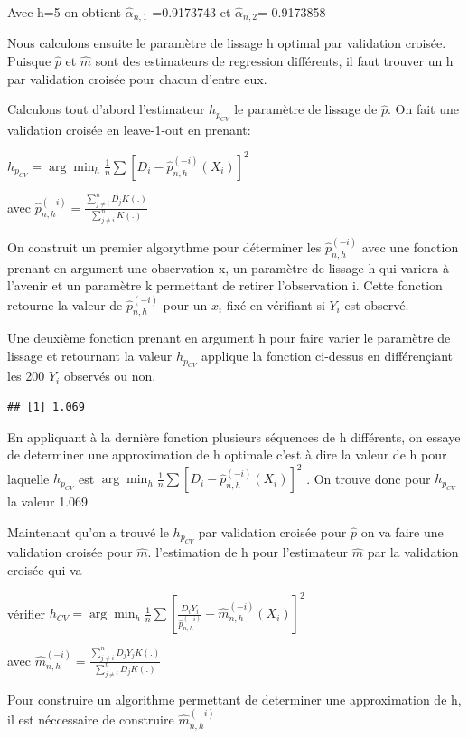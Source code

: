 \documentclass[
]{article}
\begin{document}
Avec h=5 on obtient \(\hat \alpha_{n,1}\) =0.9173743 et
\(\hat \alpha_{n,2}\)= 0.9173858

Nous calculons ensuite le paramètre de lissage h optimal par validation
croisée. Puisque \(\hat p\) et \(\hat m\) sont des estimateurs de
regression différents, il faut trouver un h par validation croisée pour
chacun d'entre eux.

Calculons tout d'abord l'estimateur \(h_{p_{CV}}\) le paramètre de
lissage de \(\hat p\). On fait une validation croisée en leave-1-out en
prenant:

\(h_{p_{CV}}=\arg\min_h \frac{1}{n}\sum[D_i-\hat p_{n,h}^{(-i)}(X_i)]^2\)

avec
\(\hat p_{n,h}^{(-i)}=\frac{\sum\limits_{j\neq i}^n D_j K(.)}{\sum \limits_{j\neq i}^n K(.)}\)

On construit un premier algorythme pour déterminer les
\(\hat p_{n,h}^{(-i)}\) avec une fonction prenant en argument une
observation x, un paramètre de lissage h qui variera à l'avenir et un
paramètre k permettant de retirer l'observation i. Cette fonction
retourne la valeur de \(\hat p_{n,h}^{(-i)}\) pour un \(x_i\) fixé en
vérifiant si \(Y_i\) est observé.

Une deuxième fonction prenant en argument h pour faire varier le
paramètre de lissage et retournant la valeur \(h_{p_{CV}}\) applique la
fonction ci-dessus en différençiant les 200 \(Y_i\) observés ou non.

\begin{verbatim}
## [1] 1.069
\end{verbatim}

En appliquant à la dernière fonction plusieurs séquences de h
différents, on essaye de determiner une approximation de h optimale
c'est à dire la valeur de h pour laquelle \(h_{p_{CV}}\) est
\(\arg\min_{h} \frac{1}{n}\sum[D_i- \hat p_{n,h}^{(-i)}(X_i)]^2\) . On
trouve donc pour \(h_{p_{CV}}\) la valeur 1.069

Maintenant qu'on a trouvé le \(h_{p_{CV}}\) par validation croisée pour
\(\hat p\) on va faire une validation croisée pour \(\hat m\).
l'estimation de h pour l'estimateur \(\hat m\) par la validation croisée
qui va

vérifier
\(h_{CV}=\arg\min_{h} \frac{1}{n}\sum[\frac{D_iY_i}{\hat p_{n,h}^{(-i)}}- \hat m_{n,h}^{(-i)}(X_i)]^2\)

avec
\(\hat m_{n,h}^{(-i)}=\frac{\sum\limits_{j\neq i}^n D_jY_j K(.)}{\sum \limits_{j\neq i}^n D_jK(.)}\)

Pour construire un algorithme permettant de determiner une approximation
de h, il est néccessaire de construire \(\hat m_{n,h}^{(-i)}\)
\end{document}
